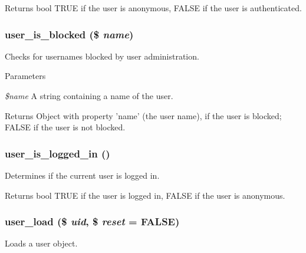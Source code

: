 \begin{DoxyReturn}{Returns}
bool TRUE if the user is anonymous, FALSE if the user is authenticated. 
\end{DoxyReturn}
\hypertarget{user_8module_ac55b4d1a61adfcd30acc1b51eaa5f741}{
\subsubsection[{user\_\-is\_\-blocked}]{\setlength{\rightskip}{0pt plus 5cm}user\_\-is\_\-blocked (\$ {\em name})}}
\label{user_8module_ac55b4d1a61adfcd30acc1b51eaa5f741}
Checks for usernames blocked by user administration.


\begin{DoxyParams}{Parameters}
\item[{\em \$name}]A string containing a name of the user.\end{DoxyParams}
\begin{DoxyReturn}{Returns}
Object with property 'name' (the user name), if the user is blocked; FALSE if the user is not blocked. 
\end{DoxyReturn}
\hypertarget{user_8module_aafa6d7d07cbcb26b6728ee30122fb1b0}{
\subsubsection[{user\_\-is\_\-logged\_\-in}]{\setlength{\rightskip}{0pt plus 5cm}user\_\-is\_\-logged\_\-in ()}}
\label{user_8module_aafa6d7d07cbcb26b6728ee30122fb1b0}
Determines if the current user is logged in.

\begin{DoxyReturn}{Returns}
bool TRUE if the user is logged in, FALSE if the user is anonymous. 
\end{DoxyReturn}
\hypertarget{user_8module_a0f7e67c4e909ca691f57889dd5a72a07}{
\subsubsection[{user\_\-load}]{\setlength{\rightskip}{0pt plus 5cm}user\_\-load (\$ {\em uid}, \/  \$ {\em reset} = {\ttfamily FALSE})}}
\label{user_8module_a0f7e67c4e909ca691f57889dd5a72a07}
Loads a user object.

